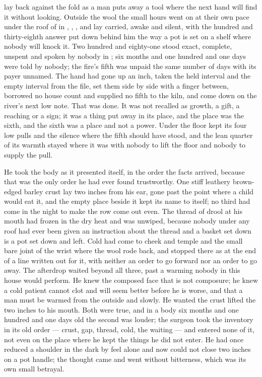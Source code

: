 
 lay back against the fold as a man puts away a tool where the next hand will find it without looking. Outside the wool the small hours went on at their own pace under the roof of  in , , , and  lay carried, awake and silent, with the hundred and thirty-eighth answer put down behind him the way a pot is set on a shelf where nobody will knock it. Two hundred and eighty-one stood exact, complete, unspent and spoken by nobody in ; six months and one hundred and one days were told by nobody; the fire's fifth was unpaid the same number of days with its payer unnamed. The hand had gone up an inch, taken the held interval and the empty interval from the file, set them side by side with a finger between, borrowed no house count and supplied no fifth to the kiln, and come down on the river's next low note. That was done. It was not recalled as growth, a gift, a reaching or a sign; it was a thing put away in its place, and the place was the sixth, and the sixth was a place and not a power. Under the floor  kept its four low pulls and the silence where the fifth should have stood, and the lean quarter of its warmth stayed where it was with nobody to lift the floor and nobody to supply the pull.

He took the body as it presented itself, in the order the facts arrived, because that was the only order he had ever found trustworthy. One stiff leathery brown-edged barley crust lay two inches from his ear, gone past the point where a child would eat it, and the empty place beside it kept its name to itself; no third had come in the night to make the row come out even. The thread of drool at his mouth had frozen in the dry heat and was unwiped, because nobody under any roof had ever been given an instruction about the thread and a basket set down is a pot set down and left. Cold had come to cheek and temple and the small bare joint of the wrist where the wool rode back, and stopped there as at the end of a line written out for it, with neither an order to go forward nor an order to go away. The afterdrop waited beyond all three, past a warming nobody in this house would perform. He knew the composed face that is not composure; he knew a cold patient cannot clot and will seem better before he is worse, and that a man must be warmed from the outside and slowly. He wanted the crust lifted the two inches to his mouth. Both were true, and in a body six months and one hundred and one days old the second was louder; the surgeon took the inventory in its old order --- crust, gap, thread, cold, the waiting --- and entered none of it, not even on the place where he kept the things he did not enter. He had once reduced a shoulder in the dark by feel alone and now could not close two inches on a pot handle; the thought came and went without bitterness, which was its own small betrayal.

